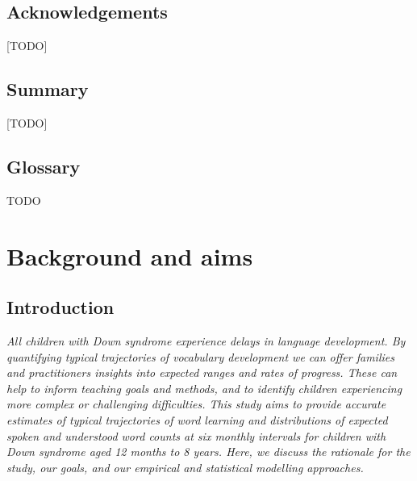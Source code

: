 \documentclass[
  11pt,
  a4paper,
]{report}
\begin{document}

\chapter*{Acknowledgements}\label{acknowledgements}


{[}TODO{]}


\chapter*{Summary}\label{summary}


{[}TODO{]}


\chapter*{Glossary}\label{glossary}


TODO

\part{Background and aims}

\chapter{Introduction}\label{introduction}

\emph{All children with Down syndrome experience delays in language
development. By quantifying typical trajectories of vocabulary
development we can offer families and practitioners insights into
expected ranges and rates of progress. These can help to inform teaching
goals and methods, and to identify children experiencing more complex or
challenging difficulties. This study aims to provide accurate estimates
of typical trajectories of word learning and distributions of expected
spoken and understood word counts at six monthly intervals for children
with Down syndrome aged 12 months to 8 years. Here, we discuss the
rationale for the study, our goals, and our empirical and statistical
modelling approaches.}
\end{document}
